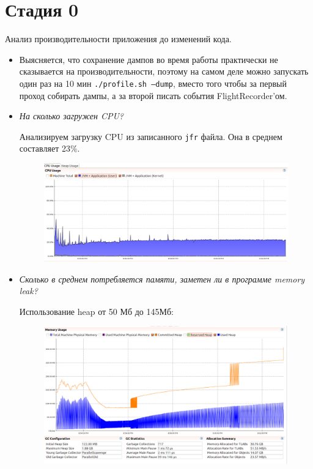 \documentclass{article}
\begin{document}
	\section*{Стадия 0}
	Анализ производительности приложения до изменений кода.
	\begin{itemize}
		\item Выясняется, что сохранение дампов во время работы практически не сказывается на производительности, поэтому на самом деле можно запускать один раз на 10 мин \texttt{./profile.sh --dump}, вместо того чтобы за первый проход собирать дампы, а за второй писать события FlightRecorder'ом.
		\newpage
		\item \textit{На сколько загружен CPU?}
		
		Анализируем загрузку CPU из записанного \texttt{jfr} файла. Она в среднем составляет 23\%. 
		\begin{figure}[h!] %
			\centering
			\includegraphics[width=0.95\linewidth]{img/stage_0/cpu.png}
			\label{fig:cpu0}
		\end{figure}
		
		\item \textit{Сколько в среднем потребляется памяти, заметен ли в программе memory leak?		}

		Использование heap от 50 Мб до 145Мб:
		\begin{figure}[h!] %
			\centering
			\includegraphics[width=0.95\linewidth]{img/stage_0/memory.png}
			\label{fig:mem0}
		\end{figure}
		\newpage


\end{itemize}
\end{document}
